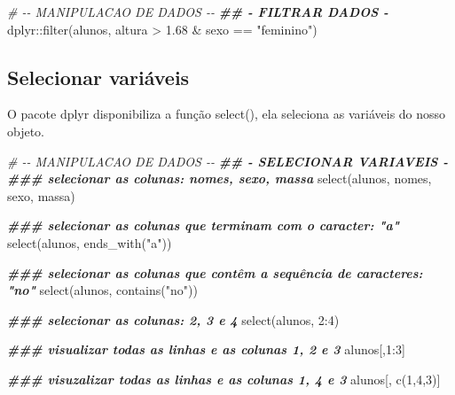 \documentclass[
]{book}
\newenvironment{Shaded}{\begin{snugshade}}{\end{snugshade}}
\newcommand{\CommentTok}[1]{\textcolor[rgb]{0.56,0.35,0.01}{\textit{#1}}}
\newcommand{\DecValTok}[1]{\textcolor[rgb]{0.00,0.00,0.81}{#1}}
\newcommand{\DocumentationTok}[1]{\textcolor[rgb]{0.56,0.35,0.01}{\textbf{\textit{#1}}}}
\newcommand{\FloatTok}[1]{\textcolor[rgb]{0.00,0.00,0.81}{#1}}
\newcommand{\FunctionTok}[1]{\textcolor[rgb]{0.00,0.00,0.00}{#1}}
\newcommand{\NormalTok}[1]{#1}
\newcommand{\SpecialCharTok}[1]{\textcolor[rgb]{0.00,0.00,0.00}{#1}}
\newcommand{\StringTok}[1]{\textcolor[rgb]{0.31,0.60,0.02}{#1}}
\begin{document}
\begin{Shaded}
\begin{Highlighting}[]
\CommentTok{\# {-}{-} MANIPULACAO DE DADOS {-}{-}}
\DocumentationTok{\#\# {-} FILTRAR DADOS {-}}
\NormalTok{dplyr}\SpecialCharTok{::}\FunctionTok{filter}\NormalTok{(alunos, altura }\SpecialCharTok{\textgreater{}} \FloatTok{1.68} \SpecialCharTok{\&}\NormalTok{ sexo }\SpecialCharTok{==} \StringTok{"feminino"}\NormalTok{)}
\end{Highlighting}
\end{Shaded}

\hypertarget{selecionar-variuxe1veis}{%
\subsection{Selecionar variáveis}\label{selecionar-variuxe1veis}}

O pacote dplyr disponibiliza a função select(), ela seleciona as variáveis do nosso objeto.

\begin{Shaded}
\begin{Highlighting}[]
\CommentTok{\# {-}{-} MANIPULACAO DE DADOS {-}{-}}
\DocumentationTok{\#\# {-} SELECIONAR VARIAVEIS {-}}
\DocumentationTok{\#\#\# selecionar as colunas: nomes, sexo, massa}
\FunctionTok{select}\NormalTok{(alunos, nomes, sexo, massa)}

\DocumentationTok{\#\#\# selecionar as colunas que terminam com o caracter: "a"}
\FunctionTok{select}\NormalTok{(alunos, }\FunctionTok{ends\_with}\NormalTok{(}\StringTok{"a"}\NormalTok{))}

\DocumentationTok{\#\#\# selecionar as colunas que contêm a sequência de caracteres: "no"}
\FunctionTok{select}\NormalTok{(alunos, }\FunctionTok{contains}\NormalTok{(}\StringTok{"no"}\NormalTok{))}

\DocumentationTok{\#\#\# selecionar as colunas: 2, 3 e 4}
\FunctionTok{select}\NormalTok{(alunos, }\DecValTok{2}\SpecialCharTok{:}\DecValTok{4}\NormalTok{)}

\DocumentationTok{\#\#\# visualizar todas as linhas e as colunas 1, 2 e 3}
\NormalTok{alunos[,}\DecValTok{1}\SpecialCharTok{:}\DecValTok{3}\NormalTok{]}

\DocumentationTok{\#\#\# visuzalizar todas as linhas e as colunas 1, 4 e 3}
\NormalTok{alunos[, }\FunctionTok{c}\NormalTok{(}\DecValTok{1}\NormalTok{,}\DecValTok{4}\NormalTok{,}\DecValTok{3}\NormalTok{)]}
\end{Highlighting}
\end{Shaded}
\end{document}
